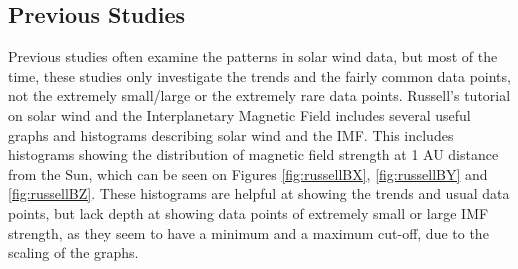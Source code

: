 \documentclass[12pt]{article}
\begin{document}
    \subsection{Previous Studies}\label{sec:prevstudies}
        Previous studies often examine the patterns in solar wind data, but most of the time, these studies only investigate the trends and the fairly common data points, not the extremely small/large or the extremely rare data points. Russell's tutorial on solar wind and the Interplanetary Magnetic Field\cite{2001russell} includes several useful graphs and histograms describing solar wind and the IMF. This includes histograms showing the distribution of magnetic field strength at 1 AU distance from the Sun, which can be seen on Figures \ref{fig:russellBX}, \ref{fig:russellBY} and \ref{fig:russellBZ}. These histograms are helpful at showing the trends and usual data points, but lack depth at showing data points of extremely small or large IMF strength, as they seem to have a minimum and a maximum cut-off, due to the scaling of the graphs.\\
\end{document}
